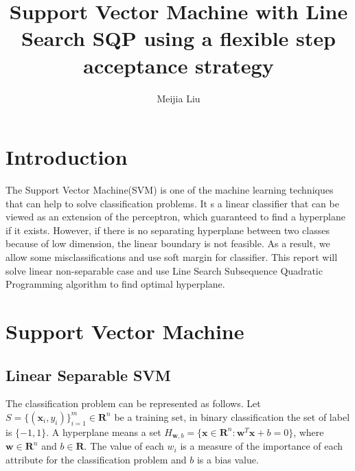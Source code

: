 \documentclass{article}
\title{Support Vector Machine with Line Search SQP using a flexible step acceptance strategy}
\author {Meijia Liu}
\begin{document}
\maketitle


\begin{spacing}{1.5}


\newpage
\setcounter{page}{1}
\tableofcontents
\newpage
\section{Introduction}
The Support Vector Machine(SVM) is one of the machine learning techniques that can help to solve classification problems. It s a linear classifier that can be viewed as an extension of the perceptron, which guaranteed to find a hyperplane if it exists. However, if there is no separating hyperplane between two classes because of low dimension, the linear boundary is not feasible. As a result, we allow some misclassifications and use soft margin for classifier. This report will solve linear non-separable case and use Line Search Subsequence Quadratic Programming algorithm to find optimal hyperplane.

\section{Support Vector Machine}
\subsection{Linear Separable SVM}
The classification problem can be represented as follows. Let $S=\{(\bm{x}_i,y_i)\}^m_{i=1}\in \bm{R}^n$ be a training set,  in binary classification the set of label is $\{-1,1\}$. A hyperplane means a set $H_{\bm{w},b}=\{\bm{x}\in \bm{R}^n: \bm{w}^T\bm{x}+b=0\}$, where $\bm{w}\in\bm{R}^n$ and $b\in\bm{R}$.  The value of each $w_i$ is a measure of the importance of each attribute for the classification problem and $b$ is a bias value.\par


\end{spacing}
\end{document}
